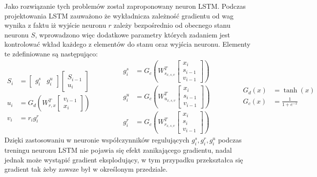 Jako rozwiązanie tych problemów został zaproponowany neuron LSTM. Podczas projektowania LSTM zauważono że wykładnicza zależność gradientu od wag wynika z faktu iż wyjście neuronu $r$ zależy bezpośrednio od obecnego stanu neuronu $S$, wprowadzono więc dodatkowe parametry których zadaniem jest kontrolować wkład każdego z elementów do stanu oraz wyjścia neuronu.\cite[p.~22,23]{LSTM-intro} Elementy te zdefiniowane są następująco:
\begin{equation*}
    \label{eqn:lstm-neuron}
\begin{split} 
   	S_i &= \begin{bmatrix} g^s_i & g^u_i \end{bmatrix} \begin{bmatrix} S_{i-1} \\ u_i\end{bmatrix} \\
   	u_i &= G_d(W^T_{r,x}\begin{bmatrix}v_{i-1} \\ x_i \end{bmatrix} ) \\
   	v_i &= r_ig^r_i
\end{split}
\quad\quad\quad\quad
\begin{split}
   	g^s_i &=G_c( W^T_{s_{x,s,v}} \begin{bmatrix} x_i \\ s_{i-1} \\ v_{i-1} \end{bmatrix}) \\
   	g^u_i &=  G_c(W^T_{u_{x,s,v}} \begin{bmatrix} x_i \\ s_{i-1} \\ v_{i-1} \end{bmatrix}) \\
   	g^r_i &=   G_c(W^T_{r_{x,s,v}} \begin{bmatrix} x_i \\ s_i \\ v_{i-1} \end{bmatrix})
\end{split}
\quad\quad\quad\quad
\begin{split}
   G_d(x) &= \tanh(x) \\
   G_c(x) &= \frac{1}{1+e^{-x}}
\end{split}
\end{equation*}
Dzięki zastosowaniu w neuronie współczynników  regulujących $g^s_i ,g^r_i, g^u_i$ podczas treningu neuronu LSTM nie pojawia się efekt zanikającego gradientu, nadal jednak może wystąpić gradient eksplodujący, w tym przypadku przekształca się gradient tak żeby zawsze był w określonym przedziale.\cite[p.~22,23]{LSTM-intro}


